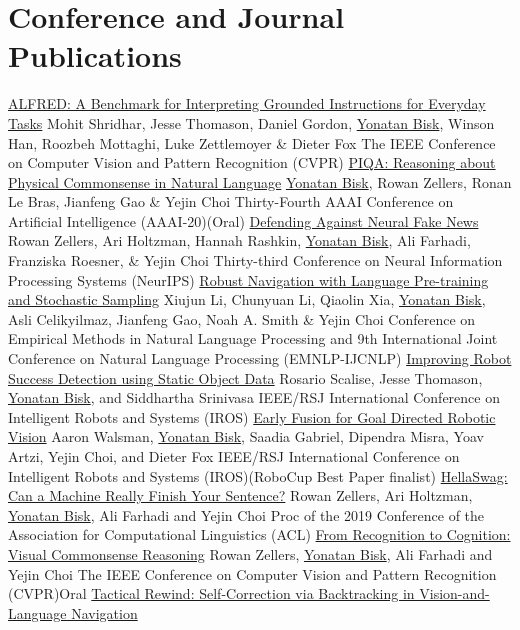 \documentclass[10pt,letter]{moderncv}
\newcommand{\YB}{\underline{Yonatan Bisk}}
\begin{document}
\section{Conference and Journal Publications}
  {\href{https://askforalfred.com}{ALFRED: A Benchmark for Interpreting Grounded Instructions for Everyday Tasks}}
  {Mohit Shridhar, Jesse Thomason, Daniel Gordon, \YB{}, Winson Han, Roozbeh Mottaghi, Luke Zettlemoyer \& Dieter Fox}
  {The IEEE Conference on Computer Vision and Pattern Recognition (CVPR)}{}{}
\pub{--}
  {\href{https://yonatanbisk.com/piqa}{PIQA: Reasoning about Physical Commonsense in Natural Language}}
  {\YB{}, Rowan Zellers, Ronan Le Bras, Jianfeng Gao \& Yejin Choi}
  {Thirty-Fourth AAAI Conference on Artificial Intelligence (AAAI-20)}{(Oral)}{}
  {\href{https://arxiv.org/abs/1905.12616}{Defending Against Neural Fake News}}
  {Rowan Zellers, Ari Holtzman, Hannah Rashkin, \YB{}, Ali Farhadi, Franziska Roesner, \& Yejin Choi}
  {Thirty-third Conference on Neural Information Processing Systems (NeurIPS)}{}{}
\pub{--}
  {\href{https://arxiv.org/abs/1909.02244}{Robust Navigation with Language Pre-training and Stochastic Sampling}}
  {Xiujun Li, Chunyuan Li, Qiaolin Xia, \YB{}, Asli Celikyilmaz, Jianfeng Gao, Noah A. Smith \& Yejin Choi}
  {Conference on Empirical Methods in Natural Language Processing and 9th International Joint Conference on Natural Language Processing (EMNLP-IJCNLP)}{}{}
\pub{--}
  {\href{https://arxiv.org/abs/1904.01650}{Improving Robot Success Detection using Static Object Data}}
  {Rosario Scalise, Jesse Thomason, \YB{}, and Siddhartha Srinivasa}
  {IEEE/RSJ International Conference on Intelligent Robots and Systems (IROS)}{}{}
\pub{--}
  {\href{https://arxiv.org/abs/1811.08824}{Early Fusion for Goal Directed Robotic Vision}}
  {Aaron Walsman, \YB{}, Saadia Gabriel, Dipendra Misra, Yoav Artzi, Yejin Choi, and Dieter Fox}
  {IEEE/RSJ International Conference on Intelligent Robots and Systems (IROS)}{(RoboCup Best Paper finalist)}{}
\pub{--}
  {\href{https://arxiv.org/abs/1905.07830}{HellaSwag: Can a Machine Really Finish Your Sentence?}}
  {Rowan Zellers, Ari Holtzman, \YB{}, Ali Farhadi and Yejin Choi}
  {Proc of the 2019 Conference of the Association for Computational Linguistics (ACL)}{}{}
\pub{--}
  {\href{http://visualcommonsense.com/}{From Recognition to Cognition: Visual Commonsense Reasoning}}
  {Rowan Zellers, \YB{}, Ali Farhadi and Yejin Choi}
  {The IEEE Conference on Computer Vision and Pattern Recognition (CVPR)}{Oral}{}
\pub{--}
  {\href{https://arxiv.org/abs/1903.02547}{Tactical Rewind: Self-Correction via Backtracking in Vision-and-Language Navigation}}
\end{document}
